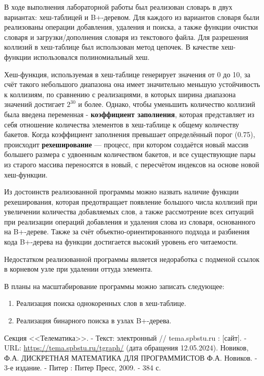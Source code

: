 \documentclass[11pt,a4paper,final]{article} %
\begin{document}
\setlength{\parindent}{1.2cm}
В ходе выполнения лабораторной работы был реализован словарь в двух вариантах: хеш-таблицей и B+-деревом. Для каждого из вариантов словаря были реализованы операции добавления, удаления и поиска, а также функции очистки словаря и загрузки/дополнения словаря из текстового файла. Для разрешения коллизий в хеш-таблице был использован метод цепочек. В качестве хеш-функции использовался полиномиальный хеш. \par
Хеш-функция, используемая в хеш-таблице генерирует значения от 0 до 10, за счёт такого небольшого диапазона она имеет значительно меньшую устойчивость к коллизиям, по сравнению с реализациями, в которых ширина диапазона значений достигает $2^{30}$ и более. Однако, чтобы уменьшить количество коллизий была введена переменная - \textbf{коэффициент заполнения}, которая представляет из себя отношение количества элементов в хеш-таблице к общему количеству бакетов. Когда коэффициент заполнения превышает определённый порог (0.75), происходит \textbf{рехеширование} — процесс, при котором создаётся новый массив большего размера с удвоенным количеством бакетов, и все существующие пары из старого массива переносятся в новый, с пересчётом индексов на основе новой хеш-функции. 

Из достоинств реализованной программы можно назвать наличие функции рехеширования, которая предотвращает появление большого числа коллизий при увеличении количества добавляемых слов, а также рассмотрение всех ситуаций при реализации операций добавления и удаления слова из словаря, основанного на B+-дереве. Также за счёт объектно-ориентированного подхода и разбиения кода B+-дерева на функции достигается высокий уровень его читаемости.\par

Недостатком реализованной программы является недоработка с подменой ссылок в корневом узле при удалении оттуда элемента. \par

В планы на масштабирование программы можно записать следующее:
\begin{enumerate}
	\item Реализация поиска однокоренных слов в хеш-таблице.
	\item Реализация бинарного поиска в узлах B+-дерева.
\end{enumerate}

\newpage
{}
\begin{thebibliography}{0}
	 Секция <<Телематика>>. - Текст: электронный // tema.spbstu.ru : [сайт]. - URL: \href{https://tema.spbstu.ru/tgraph/}{https://tema.spbstu.ru/tgraph/} (дата обращения 12.05.2024).
	  Новиков, Ф.А. ДИСКРЕТНАЯ МАТЕМАТИКА ДЛЯ ПРОГРАММИСТОВ Ф.А. Новиков. - 3-е издание. - Питер : Питер Пресс, 2009. - 384 с.
\end{thebibliography}
\end{document}
